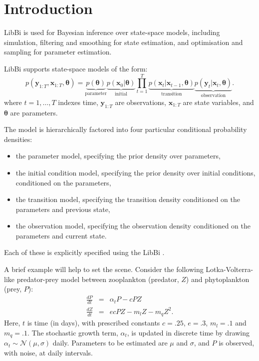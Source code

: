 \section{Introduction\label{Introduction}}

LibBi is used for Bayesian inference over state-space models, including
simulation, filtering and smoothing for state estimation, and optimisation and
sampling for parameter estimation.

LibBi supports state-space models of the form:
\begin{equation*}
p(\mathbf{y}_{1:T},\mathbf{x}_{1:T},\boldsymbol{\theta}) =
\underbrace{p(\boldsymbol{\theta})}_{\text{parameter}}
\underbrace{p(\mathbf{x}_0|\boldsymbol{\theta})}_{\text{initial}}
\prod_{t=1}^T
\underbrace{p(\mathbf{x}_t|\mathbf{x}_{t-1},\boldsymbol{\theta})}_{\text{transition}}
\underbrace{p(\mathbf{y}_t|\mathbf{x}_t,\boldsymbol{\theta})}_{\text{observation}}.
\end{equation*}
where $t = 1,\ldots,T$ indexes time, $\mathbf{y}_{1:T}$ are observations,
$\mathbf{x}_{1:T}$ are state variables, and $\boldsymbol{\theta}$ are
parameters.

The model is hierarchically factored into four particular conditional
probability densities:
\begin{itemize}
\item the parameter model, specifying the prior density over parameters,
\item the initial condition model, specifying the prior density over initial
  conditions, conditioned on the parameters,
\item the transition model, specifying the transition density conditioned on
  the parameters and previous state,
\item the observation model, specifying the observation density conditioned on
  the parameters and current state.
\end{itemize}
Each of these is explicitly specified using the LibBi
.

A brief example will help to set the scene. Consider the following
Lotka-Volterra-like predator-prey model between zooplankton (predator, $Z$)
and phytoplankton (prey, $P$):
\begin{eqnarray*}
\frac{dP}{dt} &=& \alpha_t P - cPZ\\
\frac{dZ}{dt} &=& ecPZ - m_lZ - m_q Z^2.
\end{eqnarray*}
Here, $t$ is time (in days), with prescribed constants $c = .25$, $e = .3$,
$m_l = .1$ and $m_q = .1$. The stochastic growth term, $\alpha_t$, is updated
in discrete time by drawing $\alpha_t \sim \mathcal{N}(\mu,\sigma)$
daily. Parameters to be estimated are $\mu$ and $\sigma$, and $P$ is observed,
with noise, at daily intervals.

